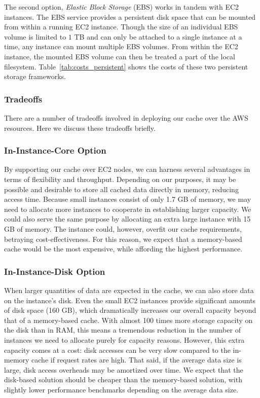 The second option, \emph{Elastic Block Storage} (EBS) works in tandem with EC2
instances. The EBS service provides a persistent disk space that can be mounted
from within a running EC2 instance. Though the size of an individual EBS volume
is limited to $1$ TB and can only be attached to a single instance at a time,
any instance can mount multiple EBS volumes. From within the EC2 instance, the
mounted EBS volume can then be treated a part of the local filesystem.
Table~\ref{tab:costs_persistent} shows the costs of these two persistent
storage frameworks.

\subsubsection{Tradeoffs} %
\label{sub:aws_tradeoffs}
There are a number of tradeoffs involved in deploying our cache over the AWS
resources. Here we discuss these tradeoffs briefly.

\subsubsection{In-Instance-Core Option} %
\label{subsub:in_instance_core}
By supporting our cache over EC2 nodes, we can harness several advantages in
terms of flexibility and throughput. Depending on our purposes, it may be
possible and desirable to store all cached data directly in memory, reducing
access time. Because small instances consist of only 1.7 GB of memory, we may
need to allocate more instances to cooperate in establishing larger capacity.
We could also serve the same purpose by allocating an extra large instance with
15 GB of memory. The instance could, however, overfit our cache requirements,
betraying cost-effectiveness. For this reason, we expect that a memory-based
cache would be the most expensive, while affording the highest performance.

\subsubsection{In-Instance-Disk Option} %
\label{subsub:in_instance_disk}
When larger quantities of data are expected in the cache, we can also store
data on the instance's disk. Even the small EC2 instances provide significant
amounts of disk space (160 GB), which dramatically increases our overall
capacity beyond that of a memory-based cache. With almost 100 times more
storage capacity on the disk than in RAM, this means a tremendous reduction in
the number of instances we need to allocate purely for capacity reasons.
However, this extra capacity comes at a cost: disk accesses can be very slow
compared to the in-memory cache if request rates are high. That said, if the
average data size is large, disk access overheads may be amortized over time.
We expect that the disk-based solution should be cheaper than the memory-based
solution, with slightly lower performance benchmarks depending on the average
data size.

